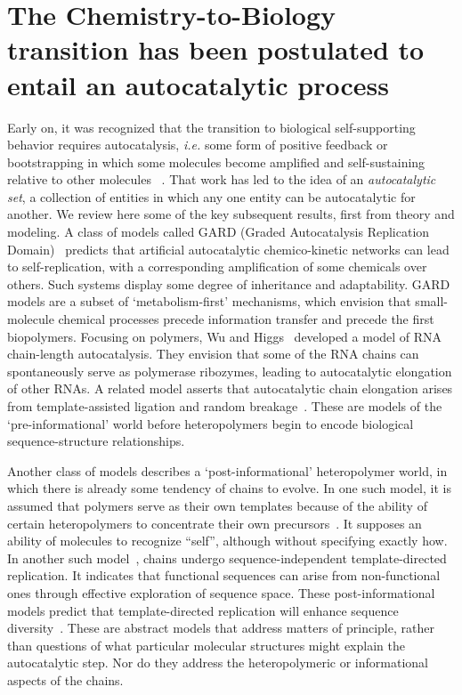 \documentclass[journal=jacsat,manuscript=article,layout=twocolumn]{achemso}
\begin{document}
 \section{The Chemistry-to-Biology transition has been postulated to entail an autocatalytic 
process}
  Early on, it was 
recognized 
that the transition to biological self-supporting behavior requires autocatalysis, \emph{i.e.} some 
form of positive feedback or 
bootstrapping in which some molecules become amplified and self-sustaining relative to other 
molecules 
~\cite{eigen1971selforganization,Eigen1977,Eigen1978,Dyson1985,Prigogine1989,Kauffman1986}.  That 
work has led to the idea of an \emph{autocatalytic set}, a collection of entities in which any one 
entity can be autocatalytic for another.  We review here some of the key subsequent results, first 
from theory and modeling.  A class of models called GARD (Graded Autocatalysis Replication 
Domain)~\cite{segre1998graded,Segre2000,Markovitch2012} predicts that artificial autocatalytic 
chemico-kinetic networks can lead to self-replication, with a corresponding amplification of some 
chemicals over others. Such systems  display some degree of 
inheritance and adaptability.  GARD models are a subset of `metabolism-first' 
mechanisms, which envision that 
small-molecule chemical processes precede information transfer and precede the first biopolymers.  
Focusing on polymers, Wu and Higgs~\cite{Wu2009} developed a model of RNA chain-length 
autocatalysis.  They envision that some of the RNA chains can spontaneously serve as polymerase 
ribozymes, leading to autocatalytic elongation of other RNAs.  A related model asserts that 
autocatalytic chain elongation arises from template-assisted ligation and random 
breakage~\cite{Tkachenko2014}.  These are models of the `pre-informational' world before 
heteropolymers begin to encode biological sequence-structure relationships.  
 
 Another class of models describes a `post-informational' heteropolymer world, in which there is 
already some tendency of chains to evolve.  In one such model, it is assumed that polymers serve 
as 
their own templates because of the ability of certain heteropolymers to concentrate their own 
precursors~\cite{nowak2008prevolutionary,Ohtsuki2009,Chen2012,Derr2012}.  It supposes an ability 
of 
molecules to recognize ``self'', although without specifying exactly how.  In another such 
model~\cite{Walker2012}, chains undergo sequence-independent template-directed replication.  It 
indicates that functional sequences can arise from non-functional ones through effective 
exploration of sequence space.  These post-informational models predict that template-directed 
replication will enhance sequence diversity~\cite{Derr2012}.   These are abstract models that 
address matters of principle, rather than questions of what particular molecular structures might 
explain the autocatalytic step. Nor do they address the heteropolymeric or informational aspects 
of 
the chains.
 
\end{document}
